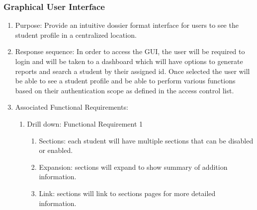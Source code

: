 \documentclass{journal}
\begin{document}
				\subsubsection{Graphical User Interface}
				\begin{enumerate}
				\item Purpose: Provide an intuitive dossier format interface for users to see the student profile in a centralized location.
				\item Response sequence: In order to access the GUI, the user will be required to login and will be taken to a dashboard which will have options to generate reports and search a student by their assigned id. Once selected the user will be able to see a student profile and be able to perform various functions based on their authentication scope as defined in the access control list.
				\item Associated Functional Requirements:
				\begin{enumerate}
				\item Drill down: Functional Requirement 1
				\begin{enumerate}
				\item Sections: each student will have multiple sections that can be disabled or enabled.
				\item Expansion: sections will expand to show summary of addition information.
				\item Link: sections will link to sections pages for more detailed information.
				\end{enumerate}
				\end{enumerate}
				\end{enumerate}
\end{document}
